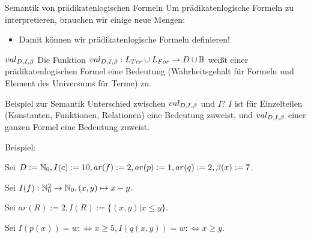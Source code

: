 \begin{frame}{Semantik von prädikatenlogischen Formeln}
	Um prädikatenlogische Formeln zu interpretieren, brauchen wir einige neue Mengen:
	
	\begin{itemize}
		\pitem Interpretation $(D, I)$\ip, bestehend aus...
		\begin{itemize}
			\pitem Universum $D \neq \emptyset$ mit...
			\begin{itemize}
				\pitem $I(c_i) \in D$ für $c_i \in Const_{PL}$
				\pitem $I(f_i) : D^{ar(f_i)} \rightarrow D$ für $f_i \in Fun_{PL}$
				\pitem $I(R_i) \subseteq D^{ar(R_i)}$ für $R_i \in Rel_{PL}$
				\pitem $I$ bildet weißt also den Komponenten Bedeutungen zu, ``definiert diese''
			\end{itemize}
			
			\pitem Variablenbelegung $\beta : Var_{PL} \rightarrow D$, z.B. $\beta(x) := 3, \beta(y) := 11$
			\begin{itemize}
				\pitem $\beta$ definiert also Variablenwerte
			\end{itemize}
		\end{itemize}
		
		\bp
		
		\item Damit können wir prädikatenlogische Formeln definieren!
	\end{itemize}
	
	\p
	
	\begin{block}{$val_{D,I,\beta}$}
		Die Funktion $val_{D,I,\beta} : L_{Ter} \cup L_{For} \rightarrow D \cup \mathbb{B}$ \ip weißt einer prädikatenlogischen Formel eine Bedeutung \ip (Wahrheitsgehalt für Formeln und Element des Universums für Terme) zu.
	\end{block}
\end{frame}


\begin{frame}{Beispiel zur Semantik}
	Unterschied zwischen $val_{D,I,\beta}$ und $I$? \pause $I$ ist für Einzelteilen (Konstanten, Funktionen, Relationen) eine Bedeutung zuweist, und $val_{D,I,\beta}$ einer ganzen Formel eine Bedeutung zuweist.\pause\vertspace
	
	Beispiel:\vertspace\ip
	
	Sei $D := \mathbb{N}_0, I(c) := 10, ar(f) := 2, ar(p) := 1, ar(q) := 2, \beta(x) := 7$.\ip
	
	Sei $I(f) : \mathbb{N}_0^2 \rightarrow \mathbb{N}_0, (x,y) \mapsto x-y$.\ip
	
	Sei $ar(R) := 2, I(R) := \{(x,y) | x \leq y\}$.\ip
	
	Sei $I(p(x)) = w :\Leftrightarrow x \geq 5, I(q(x,y)) = w :\Leftrightarrow x \geq y$.
\end{frame}

